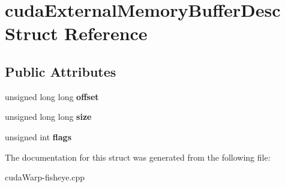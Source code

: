 \hypertarget{structcudaExternalMemoryBufferDesc}{}\section{cuda\+External\+Memory\+Buffer\+Desc Struct Reference}
\label{structcudaExternalMemoryBufferDesc}
\subsection*{Public Attributes}
\begin{DoxyCompactItemize}
\item 
unsigned long long {\bfseries offset}\hypertarget{structcudaExternalMemoryBufferDesc_a034839893ecb4e103f82498888157ba6}{}\label{structcudaExternalMemoryBufferDesc_a034839893ecb4e103f82498888157ba6}

\item 
unsigned long long {\bfseries size}\hypertarget{structcudaExternalMemoryBufferDesc_a56bdddff67c72329350ed4fa4f2cd746}{}\label{structcudaExternalMemoryBufferDesc_a56bdddff67c72329350ed4fa4f2cd746}

\item 
unsigned int {\bfseries flags}\hypertarget{structcudaExternalMemoryBufferDesc_a0a7888cacfea49ab9b30ae7e9ab47d32}{}\label{structcudaExternalMemoryBufferDesc_a0a7888cacfea49ab9b30ae7e9ab47d32}

\end{DoxyCompactItemize}


The documentation for this struct was generated from the following file\+:\begin{DoxyCompactItemize}
\item 
cuda\+Warp-\/fisheye.\+cpp\end{DoxyCompactItemize}
